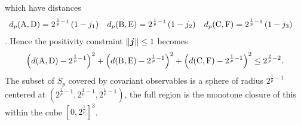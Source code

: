 which have distances
\begin{align}
  d_p(\operatorname{A}, \operatorname{D}) &= 2^{\frac{1}{p} -1}\left(1-j_1\right)&
                                                           d_p(\operatorname{B}, \operatorname{E}) &= 2^{\frac{1}{p} -1}\left(1-j_2\right)&
                                                                                                                    d_p(\operatorname{C}, \operatorname{F}) &= 2^{\frac{1}{p} -1}\left(1-j_3\right)
\end{align}.
Hence the positivity constraint ${\left\lVert{\bm{j}}\right\rVert}\leq 1$ becomes
\begin{equation}
  \left(d(\operatorname{A}, \operatorname{D}) - 2^{\frac{1}{p}-1}\right)^2 + \left(d(\operatorname{B}, \operatorname{E}) - 2^{\frac{1}{p}-1}\right)^2 +\left(d(\operatorname{C}, \operatorname{F}) - 2^{\frac{1}{p}-1}\right)^2 \leq 2^{\frac{2}{p}-2}.
\end{equation}
The subset of $S_p$ covered by covariant observables is a sphere of radius $2^{\frac{1}{p}-1}$ centered at $\left(2^{\frac{1}{p}-1},2^{\frac{1}{p}-1},2^{\frac{1}{p}-1}\right)$, the full region is the monotone closure of this within the cube $[0, 2^{\frac{1}{p}}]^3$.

